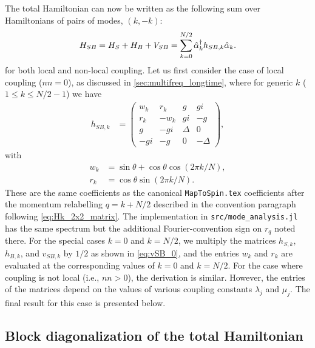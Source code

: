 The total Hamiltonian can now be written as the following sum over Hamiltonians of pairs of modes, $(k,-k)$:
\begin{equation}
    H_{SB} = H_S + H_B + V_{SB} = \sum_{k=0}^{N/2} \hat{\alpha}_k^\dagger h_{SB,k} \hat{\alpha}_k.\\
    \label{eq:app:HSB}
\end{equation}
for both local and non-local coupling. Let us first consider the case of local coupling ($nn=0$), as discussed in \cref{sec:multifreq_longtime}, where for generic $k$ ($1 \leq k \leq N/2-1$) we have
\begin{align}
    h_{SB,k} &=
    \begin{pmatrix}
        w_k &r_k  &g      &gi\\
        r_k &-w_k &gi     &-g\\
        g   &-gi  &\Delta &0\\
        -gi &-g   &0      &-\Delta
    \end{pmatrix},
\end{align}
with
\begin{align}
    w_k &= \sin\theta + \cos\theta\cos(2\pi k/N),\\
    r_k &= \cos\theta\sin(2\pi k/N).
\end{align}
These are the same coefficients as the canonical \texttt{MapToSpin.tex}
coefficients after the momentum relabelling $q=k+N/2$ described in the
convention paragraph following \cref{eq:Hk_2x2_matrix}. The implementation in
\texttt{src/mode\_analysis.jl} has the same spectrum but the additional
Fourier-convention sign on $r_q$ noted there.
For the special cases $k=0$ and $k=N/2$, we multiply the matrices $h_{S,k}$, $h_{B,k}$, and $v_{SB,k}$ by $1/2$ as shown in \cref{eq:vSB_0}, and the entries $w_k$ and $r_k$ are evaluated at the corresponding values of $k=0$ and $k=N/2$.
For the case where coupling is not local (i.e., $nn>0$), the derivation is similar. However, the entries of the matrices depend on the values of various coupling constants $\lambda_j$ and $\mu_j$. The final result for this case is presented below.

\subsection{Block diagonalization of the total Hamiltonian}


